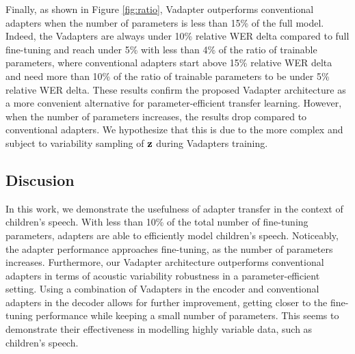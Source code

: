 Finally, as shown in Figure \ref{fig:ratio}, Vadapter outperforms conventional adapters when the number of parameters is less than 15\% of the full model. Indeed, the Vadapters are always under 10\% relative WER delta compared to full fine-tuning and reach under 5\% with less than 4\% of the ratio of trainable parameters, where conventional adapters start above 15\% relative WER delta and need more than 10\% of the ratio of trainable parameters to be under 5\% relative WER delta. These results confirm the proposed Vadapter architecture as a more convenient alternative for parameter-efficient transfer learning. However, when the number of parameters increases,  the results drop compared to conventional adapters. We hypothesize that this is due to the more complex and subject to variability sampling  of $\vb{z}$ during Vadapters training.


\subsection{Discusion}
\label{section:conclusions}
In this work, we demonstrate the usefulness of adapter transfer in the context of children's speech. With less than 10\% of the total number of fine-tuning parameters, adapters are able to efficiently model children's speech. Noticeably, the adapter performance approaches fine-tuning, as the number of parameters increases. Furthermore, our Vadapter architecture outperforms conventional adapters in terms of acoustic variability robustness in a parameter-efficient setting. Using a combination of Vadapters in the encoder and conventional adapters in the decoder allows for further improvement, getting closer to the fine-tuning performance while keeping a small number of parameters.  This seems to demonstrate their effectiveness in modelling highly variable data, such as children's speech.


